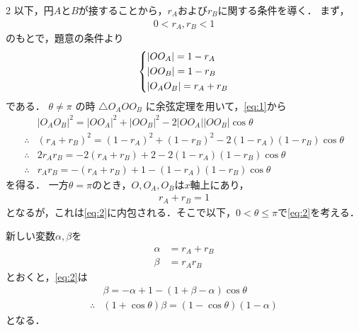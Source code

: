\documentclass[../../main.tex]{subfiles}
\begin{document}
\begin{multicols}{2}
  以下，円$A$と$B$が接することから，$r_A$および$r_B$に関する条件を導く．
  まず，
  \begin{align}
    0 < r_A, r_B < 1
  \end{align}
  のもとで，題意の条件より
  \begin{align}
    \begin{dcases}
      |OO_A|    = 1-r_A \\
      |OO_B|    = 1-r_B \\
      |O_AO_B| = r_A+r_B
    \end{dcases}\label{eq:1}
  \end{align}
  である．
  $\theta\neq\pi$ の時 $\triangle O_A O O_B$ に余弦定理を用いて，\cref{eq:1}から
  \begin{align}
    & |O_A O_B|^2 = |OO_A|^2 + |OO_B|^2 -2 |OO_A||OO_B|\cos\theta \nonumber \\
    \therefore & (r_A+r_B)^2 = (1-r_A)^2 + (1-r_B)^2 - 2(1-r_A)(1-r_B)\cos\theta                                          \nonumber \\
    \therefore & 2r_A r_B = -2(r_A+r_B) + 2 - 2(1-r_A)(1-r_B)\cos\theta       \nonumber                                             \\
    \therefore & r_A r_B = -(r_A+r_B) + 1 - (1-r_A)(1-r_B)\cos\theta    \label{eq:2}
  \end{align}
  を得る．
  一方$\theta=\pi$のとき，$O,O_A,O_B$は$x$軸上にあり，
  \begin{align}
    r_A+r_B = 1
  \end{align}
  となるが，これは\cref{eq:2}に内包される．そこで以下，$0<\theta\le\pi$で\cref{eq:2}を考える．

  新しい変数$\alpha,\beta$を
  \begin{align}
    \alpha & =r_A+r_B \\
    \beta  & =r_A r_B
  \end{align}
  とおくと，\cref{eq:2}は
  \begin{align}
    & \beta               = -\alpha+1 - (1+\beta-\alpha)\cos\theta \nonumber \\
    \therefore
    & (1+\cos\theta)\beta = (1-\cos\theta)(1-\alpha) \label{eq:3}
  \end{align}
  となる．


\end{multicols}
\end{document}
